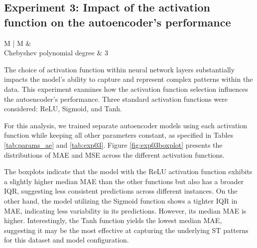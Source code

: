 \subsection{Experiment 3: Impact of the activation function on the autoencoder's performance} \label{ssec:exp3}


\begin{table}[!ht]
\begin{tabularx}{\textwidth}{ M | M }
%
&  \\ \hline
Chebyshev polynomial degree  & 3                            \\ \hline
\end{tabularx}
\caption{Specific parameters for Experiment 3}
\label{tab:exp03}
\end{table}

The choice of activation function within neural network layers substantially impacts the model's ability to capture and represent complex patterns within the data. This experiment examines how the activation function selection influences the autoencoder's performance. Three standard activation functions were considered: ReLU, Sigmoid, and Tanh.

For this analysis, we trained separate autoencoder models using each activation function while keeping all other parameters constant, as specified in Tables \ref{tab:params_ae} and \ref{tab:exp03}. Figure \ref{fig:exp03boxplot} presents the distributions of \gls{MAE} and \gls{MSE} across the different activation functions.

The boxplots indicate that the model with the ReLU activation function exhibits a slightly higher median \gls{MAE} than the other functions but also has a broader \gls{IQR}, suggesting less consistent predictions across different instances. On the other hand, the model utilizing the Sigmoid function shows a tighter \gls{IQR} in \gls{MAE}, indicating less variability in its predictions. However, its median \gls{MAE} is higher. Interestingly, the Tanh function yields the lowest median \gls{MAE}, suggesting it may be the most effective at capturing the underlying \gls{ST} patterns for this dataset and model configuration.


